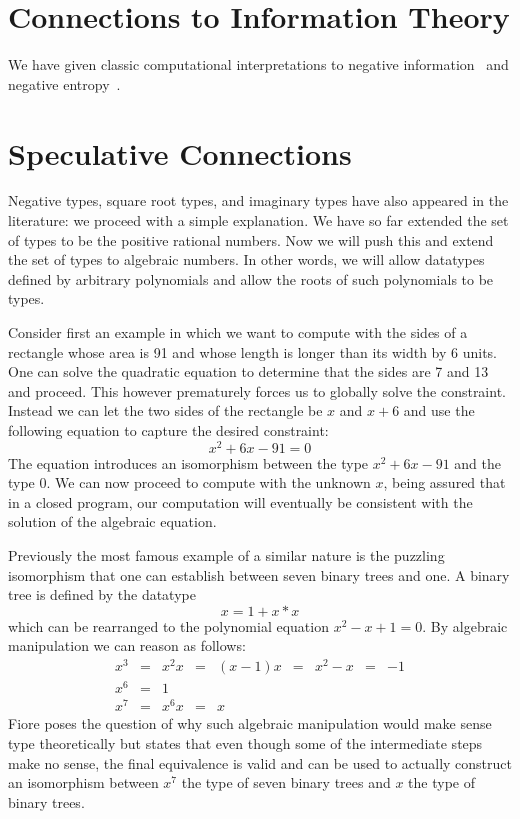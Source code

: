 \documentclass[11pt]{article}
\begin{document}
\section{Connections to Information Theory} 

We have given classic computational interpretations to negative
information~\cite{negative-information} and negative
entropy~\cite{negative-entropy}.

\section{Speculative Connections} 

Negative types, square root types, and imaginary types have also appeared in
the literature: we proceed with a simple explanation. We have so far extended
the set of types to be the positive rational numbers. Now we will push this
and extend the set of types to algebraic numbers. In other words, we will
allow datatypes defined by arbitrary polynomials and allow the roots of such
polynomials to be types.

Consider first an example in which we want to compute with the sides of a
rectangle whose area is 91 and whose length is longer than its width by 6
units. One can solve the quadratic equation to determine that the sides are 7
and 13 and proceed. This however prematurely forces us to globally solve the
constraint. Instead we can let the two sides of the rectangle be $x$ and
$x+6$ and use the following equation to capture the desired constraint:
\[
x^2 + 6x - 91 = 0
\]
The equation introduces an isomorphism between the type $x^2 + 6x - 91$ and
the type $0$. We can now proceed to compute with the unknown $x$, being
assured that in a closed program, our computation will eventually be
consistent with the solution of the algebraic equation. 

Previously the most famous example of a similar nature is the puzzling
isomorphism that one can establish between seven binary trees and one.
A binary tree is defined by the datatype
\[
x = 1 + x * x 
\]
which can be rearranged to the polynomial equation $x^2 - x + 1 = 0$. By
algebraic manipulation we can reason as follows:
\[\begin{array}{rclclclcl}
x^3 &=& x^2 x &=& (x-1) x &=& x^2 - x &=& -1 \\
x^6 &=& 1 \\
x^7 &=& x^6 x &=& x
\end{array}\]
Fiore poses the question of why such algebraic manipulation would make sense
type theoretically but states that even though some of the intermediate steps
make no sense, the final equivalence is valid and can be used to actually
construct an isomorphism between $x^7$ the type of seven binary trees 
and $x$ the type of binary trees.
\end{document}
